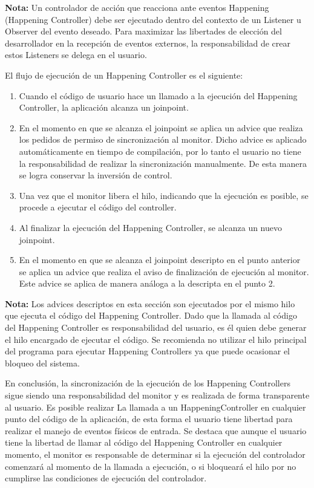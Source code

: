 \begin{framed}
\textbf{Nota:}
	Un controlador de acción que reacciona ante
	eventos Happening (Happening Controller) debe ser ejecutado dentro del
	contexto de un Listener u Observer del evento deseado.
	Para maximizar las libertades de elección del desarrollador en la recepción de
	eventos externos, la responsabilidad de crear estos Listeners se delega en el
	usuario.
\end{framed}


El flujo de ejecución de un Happening Controller es el siguiente:
\begin{enumerate}
  \item Cuando el código de usuario hace un llamado a la ejecución del Happening
  Controller, la aplicación alcanza un joinpoint.
  \item En el momento en que se alcanza el joinpoint se aplica un advice que
  realiza los pedidos de permiso de sincronización al monitor. Dicho advice es
  aplicado automáticamente en tiempo de compilación, por lo tanto el usuario no
  tiene la responsabilidad de realizar la sincronización manualmente. De esta
  manera se logra conservar la inversión de control.
  \item Una vez que el monitor libera el hilo, indicando que la ejecución es
  posible, se procede a ejecutar el código del controller.
  \item Al finalizar la ejecución del Happening Controller, se alcanza un nuevo
  joinpoint.
  \item En el momento en que se alcanza el joinpoint descripto en el punto
  anterior se aplica un advice que realiza el aviso de finalización de
  ejecución al monitor. Este advice se aplica de manera análoga a la descripta
  en el punto 2.
\end{enumerate}

\begin{framed}
\textbf{Nota:} Los advices descriptos en esta sección son ejecutados por el
mismo hilo que ejecuta el código del Happening Controller. Dado que la llamada
al código del Happening Controller es responsabilidad del usuario, es él quien
debe generar el hilo encargado de ejecutar el código. Se recomienda no utilizar
el hilo principal del programa para ejecutar Happening Controllers ya que puede
ocasionar el bloqueo del sistema.
\end{framed}

En conclusión, la sincronización de la ejecución de los Happening Controllers
sigue siendo una responsabilidad del monitor y es realizada de forma
transparente al usuario. Es posible realizar La llamada a un HappeningController
en cualquier punto del código de la aplicación, de esta forma el usuario
tiene libertad para realizar el manejo de eventos físicos de entrada. Se destaca
que aunque el usuario tiene la libertad de llamar al código del Happening
Controller en cualquier momento, el monitor es responsable de determinar si
la ejecución del controlador comenzará al momento de la llamada a ejecución, o
si bloqueará el hilo por no cumplirse las condiciones de ejecución del controlador.

